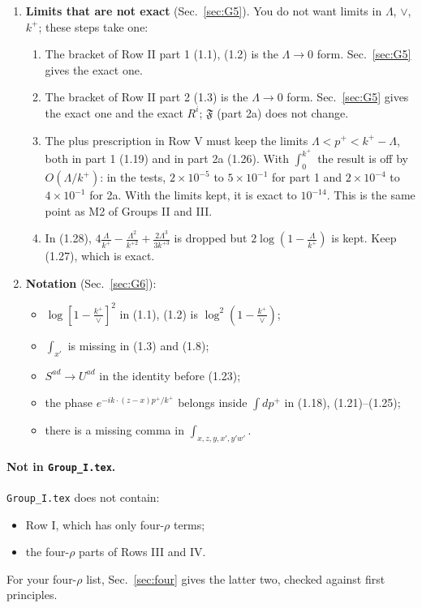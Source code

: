 \documentclass[10pt]{article}
\numberwithin{equation}{section}
\begin{document}
\begin{enumerate}
\begin{itemize}
\item The integrand has a pole at $p^+_*=k^+(x-w)^2/(x-z)^2$. When $p^+_*$ lies in the integration range, the argument of the logarithm is negative; the principal value then gives the modulus. Your Fourier transforms (i3)--(i5) are principal values too.
\end{itemize}
\item[\textbf{G5}] \textbf{Limits that are not exact} (Sec.~\ref{sec:G5}). You do not want limits in $\Lambda$, $\vee$, $k^+$; these steps take one:
\begin{enumerate}
\item The bracket of Row II part 1 (1.1), (1.2) is the $\Lambda\to0$ form. Sec.~\ref{sec:G5} gives the exact one.
\item The bracket of Row II part 2 (1.3) is the $\Lambda\to0$ form. Sec.~\ref{sec:G5} gives the exact one and the exact $R^i$; $\mathfrak F$ (part 2a) does not change.
\item The plus prescription in Row V must keep the limits $\Lambda<p^+<k^+-\Lambda$, both in part 1 (1.19) and in part 2a (1.26). With $\int_0^{k^+}$ the result is off by $O(\Lambda/k^+)$: in the tests, $2\times10^{-5}$ to $5\times10^{-1}$ for part 1 and $2\times10^{-4}$ to $4\times10^{-1}$ for 2a. With the limits kept, it is exact to $10^{-14}$. This is the same point as M2 of Groups II and III.
\item In (1.28), $4\frac{\Lambda}{k^+}-\frac{\Lambda^2}{k^{+2}}+\frac{2\Lambda^3}{3k^{+3}}$ is dropped but $2\log(1-\frac{\Lambda}{k^+})$ is kept. Keep (1.27), which is exact.
\end{enumerate}
\item[\textbf{G6}] \textbf{Notation} (Sec.~\ref{sec:G6}):
\begin{itemize}
\item $\log[1-\frac{k^+}{\vee}]^2$ in (1.1), (1.2) is $\log^2(1-\frac{k^+}{\vee})$;
\item $\int_{x'}$ is missing in (1.3) and (1.8);
\item $S^{ad}\to U^{ad}$ in the identity before (1.23);
\item the phase $e^{-ik\cdot(z-x)p^+/k^+}$ belongs inside $\int dp^+$ in (1.18), (1.21)--(1.25);
\item there is a missing comma in $\int_{x,z,y,x',y'w'}$.
\end{itemize}
\end{enumerate}
\paragraph{Not in \texttt{Group\_I.tex}.} \texttt{Group\_I.tex} does not contain:
\begin{itemize}
\item Row I, which has only four-$\rho$ terms;
\item the four-$\rho$ parts of Rows III and IV.
\end{itemize}
For your four-$\rho$ list, Sec.~\ref{sec:four} gives the latter two, checked against first principles.
\end{document}
